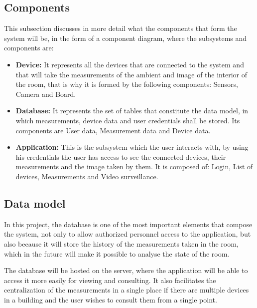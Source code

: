 \subsection{Components}\label{subsec:components}
This subsection discusses in more detail what the components that form the system will be, in the form of a component diagram, where the subsystems and components are:
\begin{itemize}
	\item \textbf{Device:} It represents all the devices that are connected to the system and that will take the measurements of the ambient and image of the interior of the room, that is why it is formed by the following components: Sensors, Camera and Board.
	\item \textbf{Database:} It represents the set of tables that constitute the data model, in which measurements, device data and user credentials shall be stored. Its components are User data, Measurement data and Device data.
	\item \textbf{Application:} This is the subsystem which the user interacts with, by using his credentials the user has access to see the connected devices, their measurements and the image taken by them. It is composed of: Login, List of devices, Measurements and Video surveillance.
\end{itemize}

\subsection{Data model}\label{subsec:data-model}
In this project, the database is one of the most important elements that compose the system, not only to allow authorized personnel access to the application, but also because it will store the history of the measurements taken in the room, which in the future will make it possible to analyse the state of the room.

The database will be hosted on the server, where the application will be able to access it more easily for viewing and consulting. It also facilitates the centralization of the measurements in a single place if there are multiple devices in a building and the user wishes to consult them from a single point.

